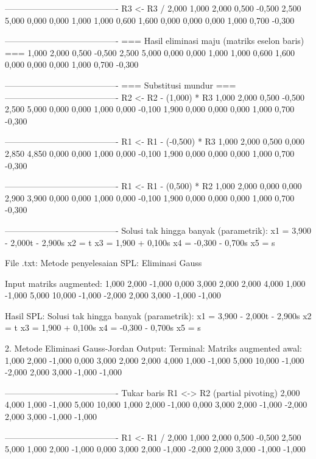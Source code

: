 \documentclass[12pt]{article}
\begin{document}
\begin{enumerate}
\begin{keluaran}
----------------------------------------
R3 <- R3 / 2,000
1,000   2,000   0,500   -0,500  2,500   5,000
0,000   0,000   1,000   1,000   0,600   1,600
0,000   0,000   0,000   1,000   0,700   -0,300

----------------------------------------
=== Hasil eliminasi maju (matriks eselon baris) ===
1,000   2,000   0,500   -0,500  2,500   5,000
0,000   0,000   1,000   1,000   0,600   1,600
0,000   0,000   0,000   1,000   0,700   -0,300

----------------------------------------
=== Substitusi mundur ===
----------------------------------------
R2 <- R2 - (1,000) * R3
1,000   2,000   0,500   -0,500  2,500   5,000
0,000   0,000   1,000   0,000   -0,100  1,900
0,000   0,000   0,000   1,000   0,700   -0,300

----------------------------------------
R1 <- R1 - (-0,500) * R3
1,000   2,000   0,500   0,000   2,850   4,850
0,000   0,000   1,000   0,000   -0,100  1,900
0,000   0,000   0,000   1,000   0,700   -0,300

----------------------------------------
R1 <- R1 - (0,500) * R2
1,000   2,000   0,000   0,000   2,900   3,900
0,000   0,000   1,000   0,000   -0,100  1,900
0,000   0,000   0,000   1,000   0,700   -0,300

----------------------------------------
Solusi tak hingga banyak (parametrik):
x1 = 3,900 - 2,000t - 2,900s
x2 = t
x3 = 1,900 + 0,100s
x4 = -0,300 - 0,700s
x5 = s

File .txt:
Metode penyelesaian SPL: Eliminasi Gauss

Input matriks augmented:
1,000	2,000	-1,000	0,000	3,000	2,000
2,000	4,000	1,000	-1,000	5,000	10,000
-1,000	-2,000	2,000	3,000	-1,000	-1,000

Hasil SPL:
Solusi tak hingga banyak (parametrik):
x1 = 3,900 - 2,000t - 2,900s
x2 = t
x3 = 1,900 + 0,100s
x4 = -0,300 - 0,700s
x5 = s


2. Metode Eliminasi Gauss-Jordan
Output:
Terminal:
Matriks augmented awal:
1,000   2,000   -1,000  0,000   3,000   2,000
2,000   4,000   1,000   -1,000  5,000   10,000
-1,000  -2,000  2,000   3,000   -1,000  -1,000

----------------------------------------
Tukar baris R1 <-> R2 (partial pivoting)
2,000   4,000   1,000   -1,000  5,000   10,000
1,000   2,000   -1,000  0,000   3,000   2,000
-1,000  -2,000  2,000   3,000   -1,000  -1,000

----------------------------------------
R1 <- R1 / 2,000
1,000   2,000   0,500   -0,500  2,500   5,000
1,000   2,000   -1,000  0,000   3,000   2,000
-1,000  -2,000  2,000   3,000   -1,000  -1,000


\end{keluaran}
\end{enumerate}
\end{document}
